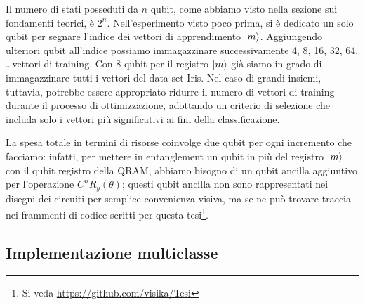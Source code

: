 Il numero di stati posseduti da $n$ qubit, come abbiamo visto nella 
sezione sui fondamenti teorici, è $2^n$. Nell'esperimento visto poco 
prima, si è dedicato un solo qubit per segnare l'indice dei vettori di 
apprendimento $\ket{m}$. Aggiungendo ulteriori qubit all'indice possiamo 
immagazzinare successivamente 4, 8, 16, 32, 64, \ldots vettori di training. 
Con 8 qubit per il registro $\ket{m}$ già siamo in grado di immagazzinare 
tutti i vettori del data set Iris. Nel caso di grandi insiemi, tuttavia, 
potrebbe essere appropriato ridurre il numero di vettori di training durante 
il processo di ottimizzazione, adottando un criterio di selezione che includa 
solo i vettori più significativi ai fini della classificazione. 

La spesa totale in termini di risorse coinvolge due qubit per ogni incremento 
che facciamo: infatti, per mettere in entanglement un qubit in più del registro 
$\ket{m}$ con il qubit registro della \ac{QRAM}, abbiamo bisogno di un qubit 
ancilla aggiuntivo per l'operazione $C^n R_y (\theta)$; questi qubit ancilla non 
sono rappresentati nei disegni dei circuiti per semplice convenienza visiva, ma 
se ne può trovare traccia nei frammenti di codice scritti per questa tesi\footnote{Si veda 
\url{https://github.com/visika/Tesi}}.

\subsection{Implementazione multiclasse}

